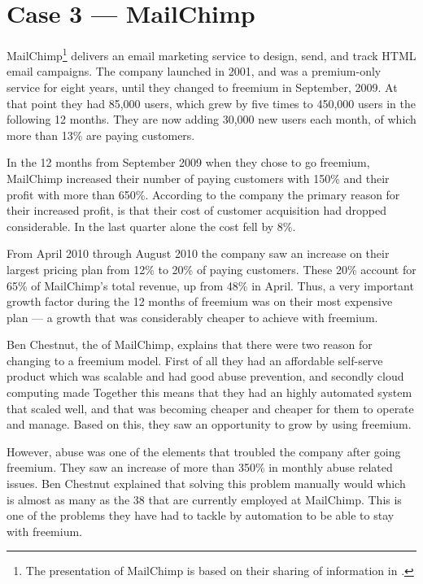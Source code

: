 \section{Case 3 --- MailChimp}

MailChimp\footnote{The presentation of MailChimp is based on their sharing of information in \citet{chestnut2010,chestnut2010b,chestnut2010c}.} delivers an email marketing service to design, send, and track HTML email campaigns. The company launched in 2001, and was a premium-only service for eight years, until they changed to freemium in September, 2009. At that point they had 85,000 users, which grew by five times to 450,000 users in the following 12 months. They are now adding 30,000 new users each month, of which more than 13\% are paying customers.

In the 12 months from September 2009 when they chose to go freemium, MailChimp increased their number of paying customers with 150\% and their profit with more than 650\%. According to the company the primary reason for their increased profit, is that their cost of customer acquisition had dropped considerable. In the last quarter alone the cost fell by 8\%. 

From April 2010 through August 2010 the company saw an increase on their largest pricing plan from 12\% to 20\% of paying customers. These 20\% account for 65\% of MailChimp's total revenue, up from 48\% in April. Thus, a very important growth factor during the 12 months of freemium was on their most expensive plan --- a growth that was considerably cheaper to achieve with freemium.

Ben Chestnut, the  of MailChimp, explains that there were two reason for changing to a freemium model. First of all they had an affordable self-serve product which was scalable and had good abuse prevention, and secondly cloud computing made  Together this means that they had an highly automated system that scaled well, and that was becoming cheaper and cheaper for them to operate and manage. Based on this, they saw an opportunity to grow by using freemium.

However, abuse was one of the elements that troubled the company after going freemium. They saw an increase of more than 350\% in monthly abuse related issues. Ben Chestnut explained that solving this problem manually would  which is almost as many as the 38 that are currently employed at MailChimp. This is one of the problems they have had to tackle by automation to be able to stay with freemium.

